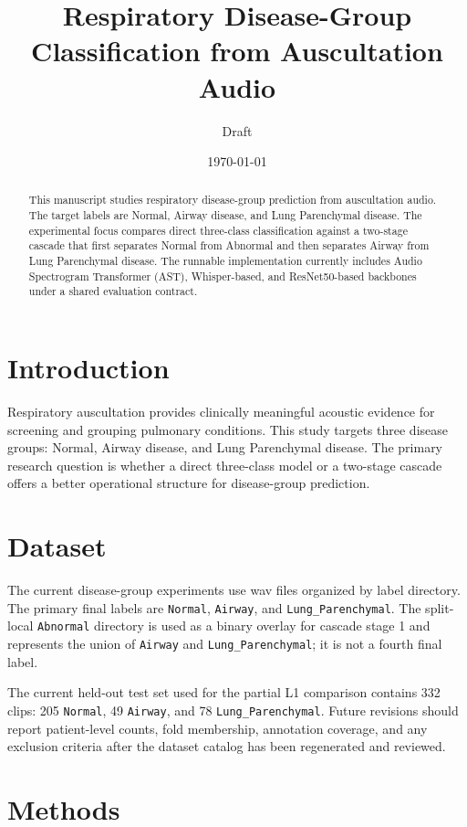 \documentclass[11pt]{article}
\title{Respiratory Disease-Group Classification from Auscultation Audio}
\author{Draft}
\date{\today}
\begin{document}
\maketitle

\begin{abstract}
This manuscript studies respiratory disease-group prediction from auscultation
audio. The target labels are Normal, Airway disease, and Lung Parenchymal
disease. The experimental focus compares direct three-class classification
against a two-stage cascade that first separates Normal from Abnormal and then
separates Airway from Lung Parenchymal disease. The runnable implementation
currently includes Audio Spectrogram Transformer (AST), Whisper-based, and
ResNet50-based backbones under a shared evaluation contract.
\end{abstract}

\section{Introduction}

Respiratory auscultation provides clinically meaningful acoustic evidence for
screening and grouping pulmonary conditions. This study targets three disease
groups: Normal, Airway disease, and Lung Parenchymal disease. The primary
research question is whether a direct three-class model or a two-stage cascade
offers a better operational structure for disease-group prediction.

\section{Dataset}

The current disease-group experiments use wav files organized by label
directory. The primary final labels are \texttt{Normal}, \texttt{Airway}, and
\texttt{Lung\_Parenchymal}. The split-local \texttt{Abnormal} directory is used
as a binary overlay for cascade stage 1 and represents the union of
\texttt{Airway} and \texttt{Lung\_Parenchymal}; it is not a fourth final label.

The current held-out test set used for the partial L1 comparison contains 332
clips: 205 \texttt{Normal}, 49 \texttt{Airway}, and 78
\texttt{Lung\_Parenchymal}. Future revisions should report patient-level
counts, fold membership, annotation coverage, and any exclusion criteria after
the dataset catalog has been regenerated and reviewed.

\section{Methods}
\end{document}
